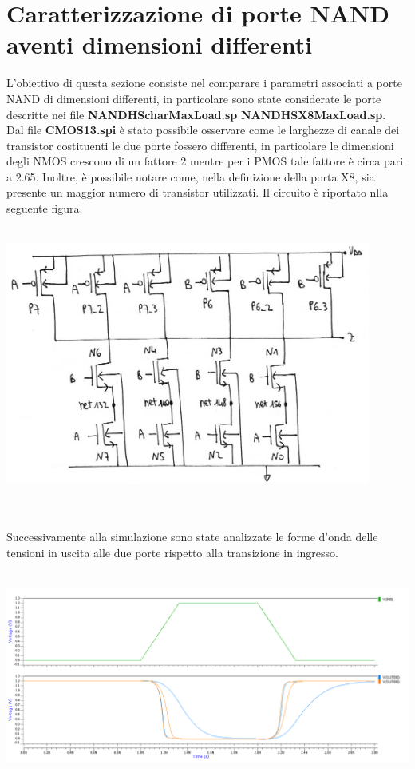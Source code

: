 \documentclass[11pt,  english, makeidx, a4paper, titlepage, oneside]{book}
\begin{document}
\section{Caratterizzazione di porte NAND aventi dimensioni differenti}
L'obiettivo di questa sezione consiste nel comparare i parametri associati a porte NAND di dimensioni differenti, in particolare sono state considerate le porte descritte nei file \textbf{NANDHScharMaxLoad.sp} \textbf{NANDHSX8MaxLoad.sp}.
\\
Dal file \textbf{CMOS13.spi} è stato possibile osservare come le larghezze di canale dei transistor costituenti le due porte fossero differenti, in particolare le dimensioni degli NMOS crescono di un fattore 2 mentre per i PMOS tale fattore è circa pari a 2.65. Inoltre, è possibile notare come, nella definizione della porta X8, sia presente un maggior numero di transistor utilizzati. Il circuito è riportato nlla seguente figura.
\\\\
\centerline{\includegraphics[width=12cm]{./img/Lab_5/X8.jpg}}
\\\\
Successivamente alla simulazione sono state analizzate le forme d'onda delle tensioni in uscita alle due porte rispetto alla transizione in ingresso.
\\\\
\centerline{\includegraphics[width=14cm]{./img/Lab_5/waveform_4.png}}
\end{document}
